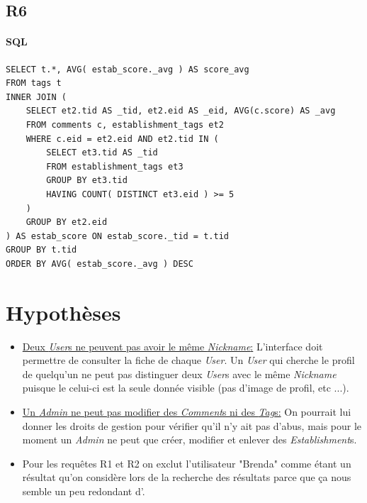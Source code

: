 \documentclass[11pt,a4paper]{report}
\begin{document}
\subsection*{R6}
\paragraph*{SQL}
\begin{verbatim}
SELECT t.*, AVG( estab_score._avg ) AS score_avg
FROM tags t
INNER JOIN (
    SELECT et2.tid AS _tid, et2.eid AS _eid, AVG(c.score) AS _avg
    FROM comments c, establishment_tags et2
    WHERE c.eid = et2.eid AND et2.tid IN (
        SELECT et3.tid AS _tid
        FROM establishment_tags et3
        GROUP BY et3.tid
        HAVING COUNT( DISTINCT et3.eid ) >= 5
    )
    GROUP BY et2.eid
) AS estab_score ON estab_score._tid = t.tid
GROUP BY t.tid 
ORDER BY AVG( estab_score._avg ) DESC
\end{verbatim}

\section*{Hypothèses}
\noindent

\begin{itemize}
\item \underline{Deux \textit{User}s ne peuvent pas avoir le même \textit{Nickname}:} L'interface doit permettre de consulter la fiche de chaque \textit{User}. Un \textit{User} qui cherche le profil de quelqu'un ne peut pas distinguer deux \textit{User}s avec le même \textit{Nickname} puisque le celui-ci est la seule donnée visible (pas d'image de profil, etc ...).
\item \underline{Un \textit{Admin} ne peut pas modifier des \textit{Comment}s ni des \textit{Tag}s:} On pourrait lui donner les droits de gestion pour vérifier qu'il n'y ait pas d'abus, mais pour le moment un \textit{Admin} ne peut que créer, modifier et enlever des \textit{Establishment}s.
\item Pour les requêtes R1 et R2 on exclut l'utilisateur "Brenda" comme étant un résultat qu'on considère lors de la recherche des résultats parce que ça nous semble un peu redondant d'.
\end{itemize}
\end{document}
